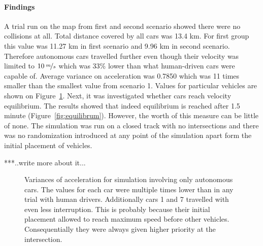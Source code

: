 \documentclass[11pt,english]{article}
\begin{document}
\paragraph{Findings}

A trial run on the map from first and second scenario showed there were no collisions at all. Total distance covered by all cars was 13.4 km. For first group this value was 11.27 km in first scenario and 9.96 km in second scenario. Therefore autonomous cars travelled further even though their velocity was limited to $10\:\nicefrac{m}{s}$ which was 33\% lower than what human-driven cars were capable of. Average variance on acceleration was 0.7850 which was 11 times smaller than the smallest value from scenario 1. Values for particular vehicles are shown on Figure~\ref{fig:acc_autonomous_only_var}. Next, it was investigated whether cars reach velocity equilibrium. The results showed that indeed equilibrium is reached after 1.5 minute (Figure~\ref{fig:equilibrum}). However, the worth of this measure can be little of none. The simulation was run on a closed track with no intersections and there was no randomization introduced at any point of the simulation apart form the initial placement of vehicles.

***..write more about it...

\begin{figure}[!] %
\caption{Variances of acceleration for simulation involving only autonomous cars. The values for each car were multiple times lower than in any trial with human drivers. Additionally cars 1 and 7 travelled with even less interruption. This is probably because their initial placement allowed to reach maximum speed before other vehicles. Consequentially they were always given higher priority at the intersection.}
\label{fig:acc_autonomous_only_var}
\end{figure} 
\end{document}
